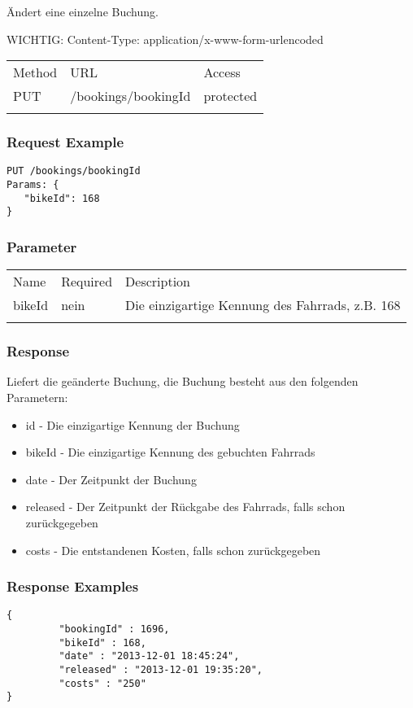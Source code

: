 Ändert eine einzelne Buchung.

WICHTIG: Content-Type: application/x-www-form-urlencoded

\begin{longtable}[c]{@{}lll@{}}
\toprule\addlinespace
Method & URL & Access
\\\addlinespace
\midrule\endhead
PUT & /bookings/bookingId & protected
\\\addlinespace
\bottomrule
\end{longtable}

\subsubsection{Request Example}\label{request-example}

\begin{verbatim}
PUT /bookings/bookingId
Params: {
   "bikeId": 168
}
\end{verbatim}

\subsubsection{Parameter}\label{parameter}

\begin{longtable}[c]{@{}lll@{}}
\toprule\addlinespace
Name & Required & Description
\\\addlinespace
\midrule\endhead
bikeId & nein & Die einzigartige Kennung des Fahrrads, z.B. 168
\\\addlinespace
\bottomrule
\end{longtable}

\subsubsection{Response}\label{response}

Liefert die geänderte Buchung, die Buchung besteht aus den folgenden
Parametern: 
\begin{itemize}
\item id - Die einzigartige Kennung der Buchung
\item bikeId - Die einzigartige Kennung des gebuchten Fahrrads
\item date - Der Zeitpunkt der Buchung
\item released - Der Zeitpunkt der Rückgabe des Fahrrads, falls schon zurückgegeben
\item costs - Die entstandenen Kosten, falls schon zurückgegeben
\end{itemize}

\subsubsection{Response Examples}\label{response-examples}

\begin{verbatim}
{
    	 "bookingId" : 1696,
    	 "bikeId" : 168,
    	 "date" : "2013-12-01 18:45:24",
    	 "released" : "2013-12-01 19:35:20",
    	 "costs" : "250"
}
\end{verbatim}
